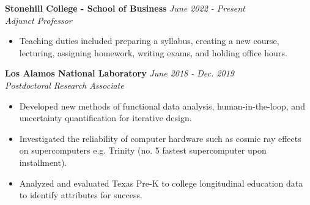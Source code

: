 \documentclass[11pt, letterpaper, roman]{moderncv} %
\newcommand{\workspace}{\vspace{3pt}}
\begin{document}
\workspace

\textbf{Stonehill College - School of Business} \hfill \textit{June 2022 - Present}\\
\textit{Adjunct Professor}
\begin{itemize}
    \item Teaching duties included preparing a syllabus, creating a new course, lecturing, assigning homework, writing exams, and holding office hours.
\end{itemize}

\workspace 

\textbf{Los Alamos National Laboratory} \hfill \textit{June 2018 - Dec. 2019}\\
\textit{Postdoctoral Research Associate}
\begin{itemize}
        \item Developed new methods of functional data analysis, human-in-the-loop, and uncertainty quantification for iterative design.
        \item Investigated the reliability of computer hardware such as cosmic ray effects on supercomputers e.g. Trinity (no. 5 fastest supercomputer upon installment).
        \item Analyzed and evaluated Texas Pre-K to college longitudinal education data to identify attributes for success.
\end{itemize}


\end{document}

